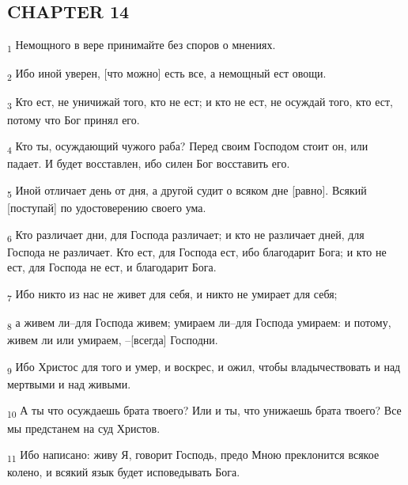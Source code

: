 \subsection{CHAPTER 14}
\begin{tcolorbox}
\textsubscript{1} Немощного в вере принимайте без споров о мнениях.
\end{tcolorbox}
\begin{tcolorbox}
\textsubscript{2} Ибо иной уверен, [что можно] есть все, а немощный ест овощи.
\end{tcolorbox}
\begin{tcolorbox}
\textsubscript{3} Кто ест, не уничижай того, кто не ест; и кто не ест, не осуждай того, кто ест, потому что Бог принял его.
\end{tcolorbox}
\begin{tcolorbox}
\textsubscript{4} Кто ты, осуждающий чужого раба? Перед своим Господом стоит он, или падает. И будет восставлен, ибо силен Бог восставить его.
\end{tcolorbox}
\begin{tcolorbox}
\textsubscript{5} Иной отличает день от дня, а другой судит о всяком дне [равно]. Всякий [поступай] по удостоверению своего ума.
\end{tcolorbox}
\begin{tcolorbox}
\textsubscript{6} Кто различает дни, для Господа различает; и кто не различает дней, для Господа не различает. Кто ест, для Господа ест, ибо благодарит Бога; и кто не ест, для Господа не ест, и благодарит Бога.
\end{tcolorbox}
\begin{tcolorbox}
\textsubscript{7} Ибо никто из нас не живет для себя, и никто не умирает для себя;
\end{tcolorbox}
\begin{tcolorbox}
\textsubscript{8} а живем ли--для Господа живем; умираем ли--для Господа умираем: и потому, живем ли или умираем, --[всегда] Господни.
\end{tcolorbox}
\begin{tcolorbox}
\textsubscript{9} Ибо Христос для того и умер, и воскрес, и ожил, чтобы владычествовать и над мертвыми и над живыми.
\end{tcolorbox}
\begin{tcolorbox}
\textsubscript{10} А ты что осуждаешь брата твоего? Или и ты, что унижаешь брата твоего? Все мы предстанем на суд Христов.
\end{tcolorbox}
\begin{tcolorbox}
\textsubscript{11} Ибо написано: живу Я, говорит Господь, предо Мною преклонится всякое колено, и всякий язык будет исповедывать Бога.
\end{tcolorbox}
